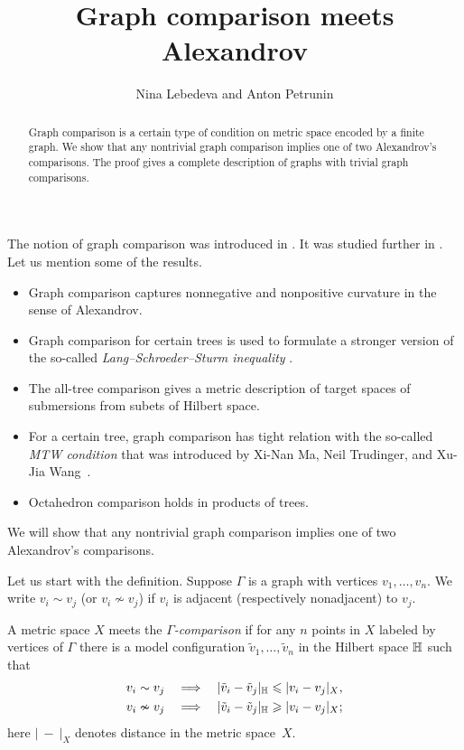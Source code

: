 \documentclass{article}
\def\thetitle{Graph comparison meets Alexandrov}
\def\theauthors{Nina Lebedeva and Anton Petrunin}
\begin{document}


\title{\thetitle}
\author{\theauthors}

\date{}
\maketitle
\begin{abstract}
Graph comparison is a certain type of condition on metric space encoded by a finite graph.
We show that any nontrivial graph comparison implies one of two Alexandrov's comparisons.
The proof gives a complete description of graphs with trivial graph comparisons.
\end{abstract}

The notion of graph comparison was introduced in \cite{lebedeva-petrunin-zolotov}.
It was studied further in \cite{toyoda,toyoda2019,lebedeva-petrunin-CBB,lebedeva,lebedeva-petrunin,lebedeva-petrunin-octahedron}.
Let us mention some of the results.
\begin{itemize}
\item Graph comparison captures nonnegative and nonpositive curvature in the sense of Alexandrov.
\item Graph comparison for certain trees is used to formulate a stronger version of the so-called \emph{Lang--Schroeder--Sturm inequality} \cite{lang-schroeder, sturm}.
\item The all-tree comparison gives a metric description of target spaces of submersions from subets of Hilbert space.
\item For a certain tree, graph comparison has tight relation with the so-called \emph{MTW condition} that was introduced by Xi-Nan Ma, Neil Trudinger, and Xu-Jia Wang~\cite{ma-trudinger-wang}.
\item Octahedron comparison holds in products of trees.
\end{itemize}
We will show that any nontrivial graph comparison implies one of two Alexandrov's comparisons.

Let us start with the definition.
Suppose $\Gamma$ is a graph with vertices $v_1,\dots,v_n$.
We write $v_i\sim v_j$ (or $v_i\nsim v_j$) if $v_i$ is adjacent (respectively nonadjacent) to $v_j$.

A metric space $X$ meets the \emph{$\Gamma$-comparison} if for any $n$ points in $X$ labeled by vertices of $\Gamma$ there is a model configuration $\tilde v_1,\dots,\tilde v_n$ in the Hilbert space $\mathbb H$ such that 
\begin{align*}
v_i\sim v_j\quad&\Longrightarrow\quad|\tilde v_i-\tilde v_j|_{\mathbb H}\leqslant | v_i-v_j|_{X},
\\
v_i\nsim v_j\quad&\Longrightarrow\quad|\tilde v_i-\tilde v_j|_{\mathbb H}\geqslant | v_i-v_j|_{X};
\end{align*}
here $|\ -\ |_X$ denotes distance in the metric space~$X$.
\end{document}
